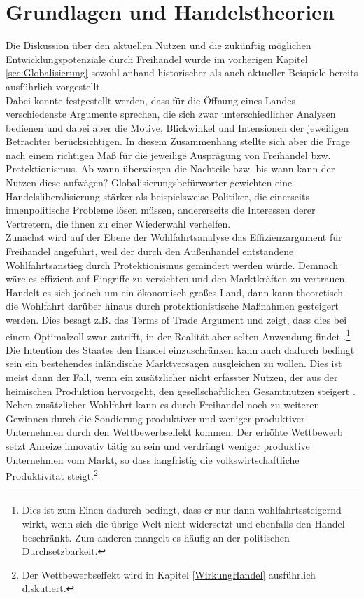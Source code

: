 \section{Grundlagen und Handelstheorien}\label{Handelstheorien}
Die Diskussion über den aktuellen Nutzen und die zukünftig möglichen Entwicklungspotenziale durch Freihandel wurde im vorherigen Kapitel \ref{sec:Globalisierung} sowohl anhand historischer als auch aktueller Beispiele bereits ausführlich vorgestellt. \\
%
 Dabei konnte festgestellt werden, dass für die Öffnung eines Landes  verschiedenste Argumente sprechen, die sich zwar unterschiedlicher Analysen bedienen und dabei aber die Motive, Blickwinkel und Intensionen der jeweiligen Betrachter berücksichtigen. In diesem Zusammenhang stellte sich aber die Frage nach einem richtigen Maß für die jeweilige Ausprägung von Freihandel bzw. Protektionismus. Ab wann überwiegen die Nachteile bzw.  bis wann kann der Nutzen diese aufwägen? Globalisierungsbefürworter gewichten eine Handelsliberalisierung stärker als beispielsweise Politiker, die einerseits innenpolitische Probleme lösen müssen, andererseits die Interessen derer Vertretern, die ihnen zu einer Wiederwahl verhelfen.\\
%
 Zunächst wird auf der Ebene der Wohlfahrtsanalyse das Effizienzargument für Freihandel angeführt, weil der durch den Außenhandel entstandene Wohlfahrtsanstieg durch Protektionismus gemindert werden würde. Demnach wäre es effizient auf Eingriffe zu verzichten und den Marktkräften zu vertrauen.
Handelt es sich jedoch um ein ökonomisch großes Land, dann kann theoretisch die Wohlfahrt darüber hinaus durch protektionistische Maßnahmen gesteigert werden. Dies besagt z.B. das Terms of Trade Argument und zeigt, dass dies bei einem Optimalzoll zwar zutrifft, in der Realität aber selten Anwendung findet \cite{Ventura.1997,  Acemoglu.2002}.\footnote{Dies ist zum Einen dadurch bedingt, dass er nur dann wohlfahrtssteigernd wirkt, wenn sich die übrige Welt nicht widersetzt und ebenfalls den Handel beschränkt. Zum anderen mangelt es häufig an der politischen Durchsetzbarkeit.}\\
%
 Die Intention des Staates den Handel einzuschränken kann auch dadurch bedingt sein ein bestehendes inländische Marktversagen ausgleichen zu wollen. Dies ist meist dann der Fall, wenn ein zusätzlicher nicht erfasster Nutzen, der aus der heimischen Produktion hervorgeht, den gesellschaftlichen Gesamtnutzen steigert \cite[Kapitel 10]{Krugman.2015}.\\
%
Neben zusätzlicher Wohlfahrt kann es durch Freihandel noch zu weiteren Gewinnen durch die Sondierung produktiver und weniger produktiver Unternehmen durch den Wettbewerbseffekt kommen. Der erhöhte Wettbewerb setzt Anreize innovativ tätig zu sein und verdrängt weniger produktive Unternehmen vom Markt, so dass lang\-fri\-stig die volkswirtschaftliche Produktivität steigt.\footnote{Der Wettbewerbseffekt wird in Kapitel \ref{WirkungHandel} ausführlich diskutiert.} \\
